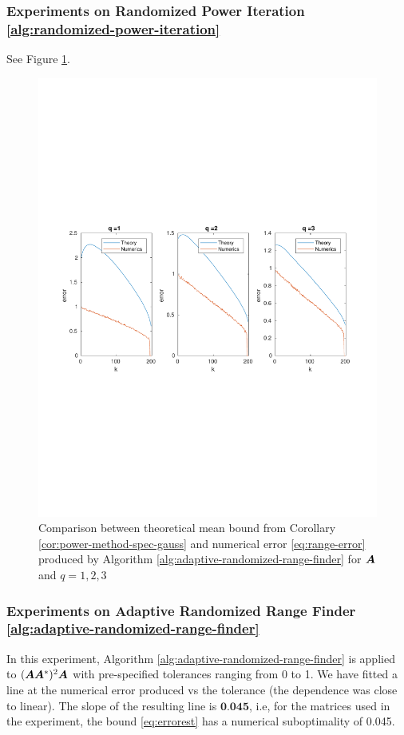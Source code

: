 \subsubsection{Experiments on Randomized Power Iteration 
\ref{alg:randomized-power-iteration}} See Figure \ref{fig:exp1-2}.
\begin{figure}[H] \label{fig:exp1-2}
\begin{center}
\includegraphics[width=\textwidth, trim=0cm 8cm 0cm 9cm, clip=true]{figures/1-5.pdf}
\end{center}
\caption{Comparison between theoretical mean bound from Corollary
\ref{cor:power-method-spec-gauss} and numerical
error \ref{eq:range-error} produced by Algorithm \ref{alg:adaptive-randomized-range-finder}
for $\bm{A}$ and $q=1,2,3$}
\end{figure}

\subsubsection{Experiments on Adaptive Randomized Range Finder
\ref{alg:adaptive-randomized-range-finder}}
In this experiment, Algorithm \ref{alg:adaptive-randomized-range-finder} is applied
to $(\bm{A}\bm{A}^*)^2\bm{A}$ with pre-specified tolerances ranging
from 0 to 1. We have fitted a line at the numerical
error produced vs the tolerance (the dependence was close to linear). The slope of the
resulting line
is $\textbf{0.045}$, i.e, for the matrices used in the experiment, the 
bound \ref{eq:errorest} has a numerical suboptimality of 0.045.
